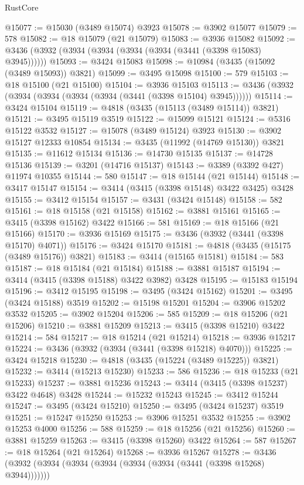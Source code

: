 \begin{lexlean}{RustCore}
\begin{coremodule}
@15077 := @15030 (@3489 @15074) @3923
@15078 := @3902 @15077
@15079 := 578
@15082 := @18 @15079 (@21 @15079)
@15083 := @3936 @15082
@15092 := @3436 (@3932 (@3934 (@3934 (@3934 (@3934 (@3441 (@3398 @15083) @3945))))))
@15093 := @3424 @15083
@15098 := @10984 (@3435 (@15092 (@3489 @15093)) @3821)
@15099 := @3495 @15098
@15100 := 579
@15103 := @18 @15100 (@21 @15100)
@15104 := @3936 @15103
@15113 := @3436 (@3932 (@3934 (@3934 (@3934 (@3934 (@3441 (@3398 @15104) @3945))))))
@15114 := @3424 @15104
@15119 := @4818 (@3435 (@15113 (@3489 @15114)) @3821)
@15121 := @3495 @15119 @3519
@15122 := @15099 @15121
@15124 := @5316 @15122 @3532
@15127 := @15078 (@3489 @15124) @3923
@15130 := @3902 @15127 @12333 @10854
@15134 := @3435 (@11992 (@14769 @15130)) @3821
@15135 := @11612 @15134
@15136 := @14730 @15135
@15137 := @14728 @15136
@15139 := @3201 (@14716 @15137)
@15143 := @3389 (@3392 @427) @11974 @10355
@15144 := 580
@15147 := @18 @15144 (@21 @15144)
@15148 := @3417 @15147
@15154 := @3414 (@3415 (@3398 @15148) @3422 @3425) @3428
@15155 := @3412 @15154
@15157 := @3431 (@3424 @15148)
@15158 := 582
@15161 := @18 @15158 (@21 @15158)
@15162 := @3881 @15161
@15165 := @3415 (@3398 @15162) @3422
@15166 := 581
@15169 := @18 @15166 (@21 @15166)
@15170 := @3936 @15169
@15175 := @3436 (@3932 (@3441 (@3398 @15170) @4071))
@15176 := @3424 @15170
@15181 := @4818 (@3435 (@15175 (@3489 @15176)) @3821)
@15183 := @3414 (@15165 @15181)
@15184 := 583
@15187 := @18 @15184 (@21 @15184)
@15188 := @3881 @15187
@15194 := @3414 (@3415 (@3398 @15188) @3422 @3982) @3428
@15195 := @15183 @15194
@15196 := @3412 @15195
@15198 := @3495 (@3424 @15162)
@15201 := @3495 (@3424 @15188) @3519
@15202 := @15198 @15201
@15204 := @3906 @15202 @3532
@15205 := @3902 @15204
@15206 := 585
@15209 := @18 @15206 (@21 @15206)
@15210 := @3881 @15209
@15213 := @3415 (@3398 @15210) @3422
@15214 := 584
@15217 := @18 @15214 (@21 @15214)
@15218 := @3936 @15217
@15224 := @3436 (@3932 (@3934 (@3441 (@3398 @15218) @4070)))
@15225 := @3424 @15218
@15230 := @4818 (@3435 (@15224 (@3489 @15225)) @3821)
@15232 := @3414 (@15213 @15230)
@15233 := 586
@15236 := @18 @15233 (@21 @15233)
@15237 := @3881 @15236
@15243 := @3414 (@3415 (@3398 @15237) @3422 @4648) @3428
@15244 := @15232 @15243
@15245 := @3412 @15244
@15247 := @3495 (@3424 @15210)
@15250 := @3495 (@3424 @15237) @3519
@15251 := @15247 @15250
@15253 := @3906 @15251 @3532
@15255 := @3902 @15253 @4000
@15256 := 588
@15259 := @18 @15256 (@21 @15256)
@15260 := @3881 @15259
@15263 := @3415 (@3398 @15260) @3422
@15264 := 587
@15267 := @18 @15264 (@21 @15264)
@15268 := @3936 @15267
@15278 := @3436 (@3932 (@3934 (@3934 (@3934 (@3934 (@3934 (@3441 (@3398 @15268) @3944)))))))

\end{coremodule}
\end{lexlean}
